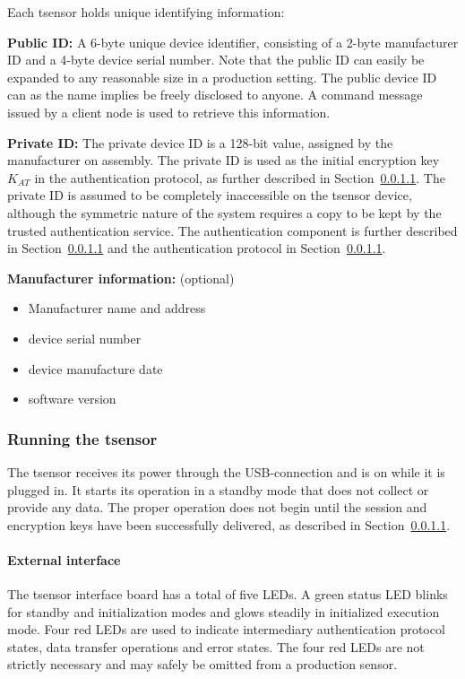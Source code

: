 Each tsensor holds unique identifying information:
\begin{description}
\item \textbf{Public ID:} A 6-byte unique device identifier, consisting of a 2-byte manufacturer ID and a 4-byte device serial number. Note that the public ID can easily be expanded to any reasonable size in a production setting. The public device ID can as the name implies be freely disclosed to anyone. A command message issued by a client node is used to retrieve this information.
\item \textbf{Private ID:} The private device ID is a 128-bit value, assigned by the manufacturer on assembly. The private ID is used as the initial encryption key $K_{AT}$ in the authentication protocol, as further described in Section~\ref{}. The private ID is assumed to be completely inaccessible on the tsensor device, although the symmetric nature of the system requires a copy to be kept by the trusted authentication service. The authentication component is further described in Section~\ref{} and the authentication protocol in Section~\ref{}.
\item \textbf{Manufacturer information:} (optional)
\begin{itemize}
\item Manufacturer name and address
\item device serial number
\item device manufacture date
\item software version
\end{itemize}
\end{description}

\subsubsection{Running the tsensor}

The tsensor receives its power through the USB-connection and is on while it is plugged in. It starts its operation in a standby mode that does not collect or provide any data. The proper operation does not begin until the session and encryption keys have been successfully delivered, as described in Section~\ref{}.

\paragraph{External interface}

The tsensor interface board has a total of five LEDs. A green status LED blinks for standby and initialization modes and glows steadily in initialized execution mode. Four red LEDs are used to indicate intermediary authentication protocol states, data transfer operations and error states. The four red LEDs are not strictly necessary and may safely be omitted from a production sensor.

